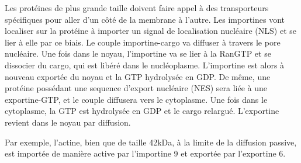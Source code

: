 \documentclass{report}
\begin{document}
Les protéines de plus grande taille doivent faire appel à des transporteurs spécifiques pour aller d'un côté de la membrane à l'autre. 
Les importines vont localiser sur la protéine à importer un signal de localisation nucléaire (NLS) et se lier à elle par ce biais. Le couple importine-cargo va diffuser à travers le pore nucléaire. Une fois dans le noyau, l'importine va se lier à la RanGTP et se dissocier du cargo, qui est libéré dans le nucléoplasme. L'importine est alors à nouveau exportée du noyau et la GTP hydrolysée en GDP. 
De même, une protéine possédant une sequence d'export nucléaire (NES) sera liée à une exportine-GTP, et le couple diffusera vers le cytoplasme. Une fois dans le cytoplasme, la GTP est hydrolysée en GDP et le cargo relargué. L'exportine revient dans le noyau par diffusion. 

Par exemple, l'actine, bien que de taille 42kDa, à la limite de la diffusion passive, est importée de manière active par l'importine 9 et exportée par l'exportine 6. 
\end{document}
